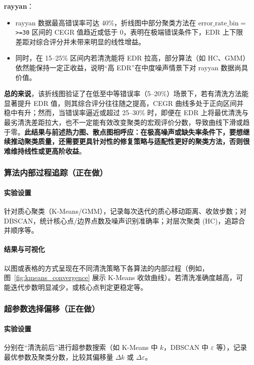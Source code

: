 \documentclass[10pt]{article} %
\numberwithin{equation}{section}
\begin{document}
\begin{enumerate}[label=(\alph*)]
\textbf{rayyan}：
    \begin{itemize}
        \item rayyan 数据最高错误率可达 40\%，折线图中部分聚类方法在 \(\mathrm{error\_rate\_bin} = \) \texttt{>=30} 区间的 CEGR 值趋近或低于 0，表明在极端错误条件下，EDR 上下限差距对综合评分并未带来明显的线性增益。
        \item 同时，在 15--25\% 区间内若清洗能将 EDR 拉高，部分算法（如 HC、GMM）依然能保持一定正收益，说明“高 EDR”在中度噪声情景下对 rayyan 数据尚具价值。
    \end{itemize}

\noindent
\textbf{总的来说}，该折线图验证了在低至中等错误率（5--20\%）场景下，若有清洗方法能显著提升 EDR 值，则其综合评分往往随之提高，CEGR 曲线多处于正向区间并稳中有升；然而，当错误率逼近或超过 25--30\% 时，即便在 EDR 上将最优清洗与最劣清洗差距拉大，也不一定能有效改变聚类的宏观评价分数，导致曲线下滑或趋于零。\textbf{此结果与前述热力图、散点图相呼应：在极高噪声或缺失率条件下，要想继续推动聚类质量，还需要更具针对性的修复策略与适配性更好的聚类方法，否则很难维持线性或更高阶收益}。  

\end{enumerate}

\subsubsection{算法内部过程追踪（正在做）}
\label{subsec:internal_tracking}

\paragraph{实验设置}
针对质心聚类（K-Means/GMM），记录每次迭代的质心移动距离、收敛步数；对 DBSCAN，统计核心点/边界点数及噪声识别准确率；对层次聚类 (HC)，追踪合并顺序等。

\paragraph{结果与可视化}
以图或表格的方式呈现在不同清洗策略下各算法的内部过程（例如，图~\ref{fig:kmeans_convergence} 展示 K-Means 收敛曲线）。若清洗准确度越高，可能迭代步数明显减少，或核心点判定更稳定等。

\subsubsection{超参数选择偏移（正在做）}
\label{subsec:param_shift}

\paragraph{实验设置}
分别在“清洗前后”进行超参数搜索（如 K-Means 中 $k$，DBSCAN 中 $\varepsilon$ 等），记录最优参数及聚类分数，比较其偏移量 \(\Delta k\) 或 \(\Delta \varepsilon\)。
\end{document}
